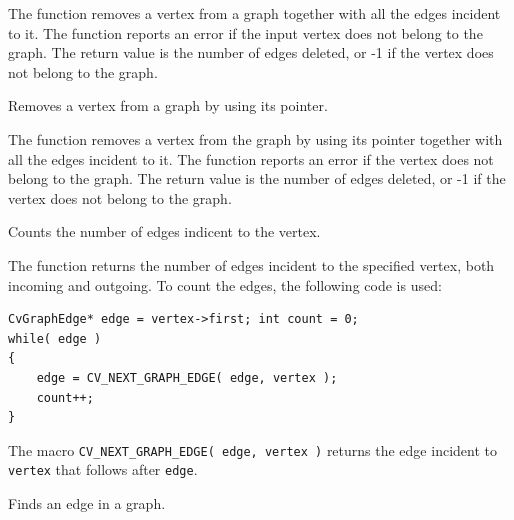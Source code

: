 The function removes a vertex from a graph
together with all the edges incident to it. The function reports an error
if the input vertex does not belong to the graph. The return value is the
number of edges deleted, or -1 if the vertex does not belong to the graph.

Removes a vertex from a graph by using its pointer.


\begin{description}
\end{description}


The function removes a vertex from the graph by using its pointer together with all the edges incident to it. The function reports an error if the vertex does not belong to the graph. The return value is the number of edges deleted, or -1 if the vertex does not belong to the graph.

Counts the number of edges indicent to the vertex.


\begin{description}
\end{description}

The function returns the number of edges incident to the specified vertex, both incoming and outgoing. To count the edges, the following code is used:

\begin{lstlisting}
CvGraphEdge* edge = vertex->first; int count = 0;
while( edge )
{
    edge = CV_NEXT_GRAPH_EDGE( edge, vertex );
    count++;
}
\end{lstlisting}

The macro \texttt{CV\_NEXT\_GRAPH\_EDGE( edge, vertex )} returns the edge incident to \texttt{vertex} that follows after \texttt{edge}.

Finds an edge in a graph.


